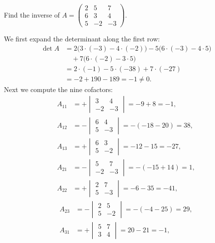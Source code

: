 \begin{misol}
Find the inverse of
$A=\begin{pmatrix}2 & 5 & 7\\ 6 & 3 & 4\\ 5 & -2 & -3\end{pmatrix}$.
\begin{yechish}
We first expand the determinant along the first row:
\begin{align*}
\det A &= 2\bigl(3 \cdot (-3) - 4 \cdot (-2)\bigr) - 5\bigl(6 \cdot (-3) - 4 \cdot 5\bigr)\\
&\quad + 7\bigl(6 \cdot (-2) - 3 \cdot 5\bigr)\\
&= 2\cdot(-1) - 5\cdot(-38) + 7\cdot(-27)\\
&= -2 + 190 - 189 = -1 \neq 0.
\end{align*}
Next we compute the nine cofactors:
\begin{align*}
A_{11} &= +\begin{vmatrix}3&4\\-2&-3\end{vmatrix} = -9+8 = -1, \\
A_{12} &= -\begin{vmatrix}6&4\\5&-3\end{vmatrix} = -(-18-20) = 38, \\
A_{13} &= +\begin{vmatrix}6&3\\5&-2\end{vmatrix} = -12-15 = -27, \\
A_{21} &= -\begin{vmatrix}5&7\\-2&-3\end{vmatrix} = -(-15+14) = 1, \\
A_{22} &= +\begin{vmatrix}2&7\\5&-3\end{vmatrix} = -6-35 = -41,
\end{align*}
\begin{align*}
A_{23} &= -\begin{vmatrix}2&5\\5&-2\end{vmatrix} = -(-4-25) = 29, \\
A_{31} &= +\begin{vmatrix}5&7\\3&4\end{vmatrix} = 20-21 = -1, \\

\end{align*}
\end{yechish}
\end{misol}
